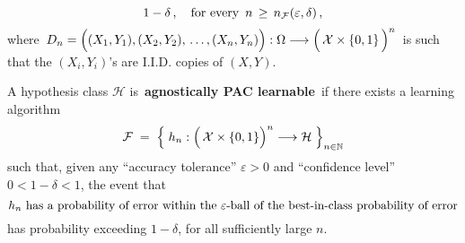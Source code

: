 \begin{definition}
\begin{equation*}
	1 - \delta\,,
\quad
	\textnormal{for every \,$n \,\geq\, n_{\mathcal{F}}(\varepsilon,\delta)$}\,,
\end{equation*}
where
\,$D_{n} = \left((X_{1},Y_{1}),(X_{2},Y_{2}),\,\overset{{\color{white}\vert}}{\ldots}\,,(X_{n},Y_{n})\right)
	: \Omega \longrightarrow
	\left(\,\mathcal{X}\overset{{\color{white}.}}{\times}\{0,1\}\,\right)^{n}$\,
is such that the
$(X_{i},Y_{i})$'s are I.I.D. copies of $(X,Y)$.
\end{definition}

\begin{remark}
\mbox{}\vskip 0.1cm
\noindent
A hypothesis class $\mathcal{H}$ is \,\textbf{agnostically PAC learnable}\, if
there exists a learning algorithm
\begin{equation*}
\mathcal{F} \; = \; \left\{\;
	h_{n} : \left(\,\mathcal{X}\overset{{\color{white}.}}{\times}\{0,1\}\right)^{n} \longrightarrow\mathcal{H}
	\;\right\}_{n\in\N}
\end{equation*}
such that, given any ``accuracy tolerance'' $\varepsilon > 0$ and
``confidence level'' $0 <1 - \delta < 1$, 
the event that
\begin{equation*}
\textnormal{$h_{n}$ has a probability of error within the $\varepsilon$-ball of
the best-in-class probability of error}
\end{equation*}
has probability exceeding $1 - \delta$, for all sufficiently large $n$.
\end{remark}

